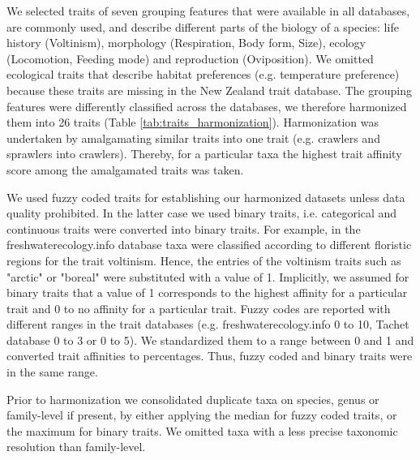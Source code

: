 \documentclass{article}
\begin{document}
We selected traits of seven grouping features that were available in all databases, are commonly used, and describe different parts of the biology of a species: life history (Voltinism), morphology (Respiration, Body form, Size), ecology (Locomotion, Feeding mode) and reproduction (Oviposition). We omitted ecological traits that describe habitat preferences (e.g. temperature preference) because these traits are missing in the New Zealand trait database. The grouping features were differently classified across the databases, we therefore harmonized them into 26 traits (Table \ref{tab:traits_harmonization}). Harmonization was undertaken by amalgamating similar traits into one trait (e.g. crawlers and sprawlers into crawlers).
Thereby, for a particular taxa the highest trait affinity score among the amalgamated traits was taken. 

We used fuzzy coded traits for establishing our harmonized datasets unless data quality prohibited. In the latter case we used binary traits, i.e. categorical and continuous traits were converted into binary traits. For example, in the  freshwaterecology.info database taxa were classified according to different floristic regions for the trait voltinism. Hence, the entries of the voltinism traits such as "arctic" or "boreal" were substituted with a value of 1. Implicitly, we assumed for binary traits that a value of 1 corresponds to the highest affinity for a particular trait and 0 to no affinity for a particular trait. Fuzzy codes are reported with different ranges in the trait databases (e.g. freshwaterecology.info 0 to 10, Tachet database 0 to 3 or 0 to 5). We standardized them to a range between 0 and 1 and converted trait affinities to percentages. Thus, fuzzy coded and binary traits were in the same range. 

Prior to harmonization we consolidated duplicate taxa on species, genus or family-level if present, by either applying the median for fuzzy coded traits, or the maximum for binary traits. We omitted taxa with a less precise taxonomic resolution than family-level.
\end{document}
